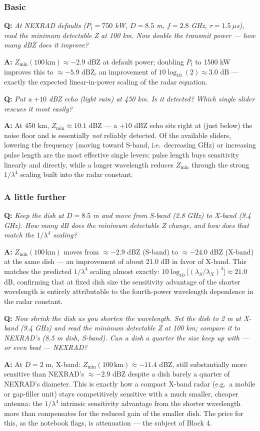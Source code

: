 \documentclass[11pt]{article}
\newenvironment{qa}[1]{\par\noindent\textbf{\color{qgray}Q: }\emph{#1}\par\noindent\textbf{A: }}{\par\vspace{6pt}}
\newcommand{\tier}[1]{\subsubsection*{#1}}
\begin{document}
\tier{Basic}
\begin{qa}{At NEXRAD defaults ($P_t=750$ kW, $D=8.5$ m, $f=2.8$ GHz, $\tau=1.5\ \mu$s), read the minimum detectable Z at 100 km. Now double the transmit power --- how many dBZ does it improve?}
$Z_{\min}(100\,\mathrm{km})\approx-2.9$ dBZ at default power; doubling $P_t$ to 1500 kW improves this to $\approx-5.9$ dBZ, an improvement of $10\log_{10}(2)\approx3.0$ dB --- exactly the expected linear-in-power scaling of the radar equation.
\end{qa}
\begin{qa}{Put a $+10$ dBZ echo (light rain) at 450 km. Is it detected? Which single slider rescues it most easily?}
At 450 km, $Z_{\min}\approx10.1$ dBZ --- a $+10$ dBZ echo sits right at (just below) the noise floor and is essentially \emph{not} reliably detected. Of the available sliders, lowering the frequency (moving toward S-band, i.e.\ decreasing GHz) or increasing pulse length are the most effective single levers: pulse length buys sensitivity linearly and directly, while a longer wavelength reduces $Z_{\min}$ through the strong $1/\lambda^4$ scaling built into the radar constant.
\end{qa}

\tier{A little further}
\begin{qa}{Keep the dish at $D=8.5$ m and move from S-band (2.8 GHz) to X-band (9.4 GHz). How many dB does the minimum detectable Z change, and how does that match the $1/\lambda^4$ scaling?}
$Z_{\min}(100\,\mathrm{km})$ moves from $\approx-2.9$ dBZ (S-band) to $\approx-24.0$ dBZ (X-band) at the same dish --- an improvement of about 21.0 dB in favor of X-band. This matches the predicted $1/\lambda^4$ scaling almost exactly: $10\log_{10}\!\big[(\lambda_S/\lambda_X)^4\big]\approx21.0$ dB, confirming that at fixed dish size the sensitivity advantage of the shorter wavelength is entirely attributable to the fourth-power wavelength dependence in the radar constant.
\end{qa}
\begin{qa}{Now shrink the dish \emph{as} you shorten the wavelength. Set the dish to 2 m at X-band (9.4 GHz) and read the minimum detectable Z at 100 km; compare it to NEXRAD's (8.5 m dish, S-band). Can a dish a quarter the size keep up with --- or even beat --- NEXRAD?}
At $D=2$ m, X-band: $Z_{\min}(100\,\mathrm{km})\approx-11.4$ dBZ, still substantially more sensitive than NEXRAD's $\approx-2.9$ dBZ despite a dish barely a quarter of NEXRAD's diameter. This is exactly how a compact X-band radar (e.g.\ a mobile or gap-filler unit) stays competitively sensitive with a much smaller, cheaper antenna: the $1/\lambda^4$ intrinsic sensitivity advantage from the shorter wavelength more than compensates for the reduced gain of the smaller dish. The price for this, as the notebook flags, is attenuation --- the subject of Block 4.
\end{qa}
\end{document}
